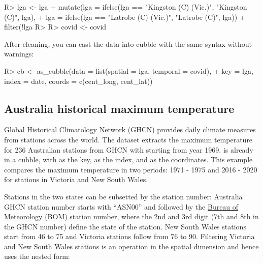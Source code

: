 \documentclass[
]{jss}
\begin{document}
\begin{CodeChunk}
\begin{CodeInput}
R> lga <- lga %
+   mutate(lga = ifelse(lga == "Kingston (C) (Vic.)", "Kingston (C)", lga),
+          lga = ifelse(lga == "Latrobe (C) (Vic.)", "Latrobe (C)", lga)) %
+   filter(!lga %
R> 
R> covid <- covid %
\end{CodeInput}
\end{CodeChunk}

After cleaning, you can cast the data into cubble with the same syntax without warnings:

\begin{CodeChunk}
\begin{CodeInput}
R> cb <- as_cubble(data = list(spatial = lga, temporal = covid),
+                 key = lga, index = date, coords = c(cent_long, cent_lat))
\end{CodeInput}
\end{CodeChunk}

\hypertarget{australia-historical-maximum-temperature}{%
\subsection{Australia historical maximum temperature}\label{australia-historical-maximum-temperature}}

Global Historical Climatology Network (GHCN) provides daily climate measures from stations across the world. The dataset  extracts the maximum temperature for 236 Australian stations from GHCN with starting from year 1969.  is already in a cubble, with  as the key,  as the index, and  as the coordinates. This example compares the maximum temperature in two periods: 1971 - 1975 and 2016 - 2020 for stations in Victoria and New South Wales.

Stations in the two states can be subsetted by the station number: Australia GHCN station number starts with ``ASN00'' and followed by the \href{http://www.bom.gov.au/climate/cdo/about/site-num.shtml}{Bureau of Meteorology (BOM) station number}, where the 2nd and 3rd digit (7th and 8th in the GHCN number) define the state of the station. New South Wales stations start from 46 to 75 and Victoria stations follow from 76 to 90. Filtering Victoria and New South Wales stations is an operation in the spatial dimension and hence uses the nested form:
\end{document}

